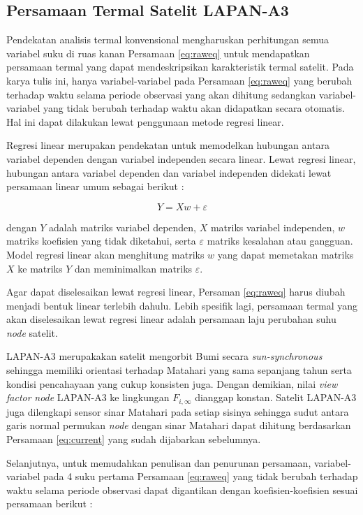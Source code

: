 \subsection{Persamaan Termal Satelit LAPAN-A3}

Pendekatan analisis termal konvensional mengharuskan perhitungan semua variabel
suku di ruas kanan Persamaan \ref{eq:raweq} untuk mendapatkan persamaan termal
yang dapat mendeskripsikan karakteristik termal satelit. Pada karya tulis ini,
hanya variabel-variabel pada Persamaan \ref{eq:raweq} yang berubah terhadap
waktu selama periode observasi yang akan dihitung sedangkan variabel-variabel
yang tidak berubah terhadap waktu akan didapatkan secara otomatis. Hal ini
dapat dilakukan lewat penggunaan metode regresi linear.

Regresi linear merupakan pendekatan untuk memodelkan hubungan antara variabel
dependen dengan variabel independen secara linear. Lewat regresi linear,
hubungan antara variabel dependen dan variabel independen didekati lewat
persamaan linear umum sebagai berikut \cite{freedman2009}:

\begin{equation}
\label{eq:reglinear}
Y = Xw + \varepsilon
\end{equation}

dengan $Y$ adalah matriks variabel dependen, $X$ matriks variabel independen,
$w$ matriks koefisien yang tidak diketahui, serta $\varepsilon$ matriks
kesalahan atau gangguan. Model regresi linear akan menghitung matriks $w$ yang dapat memetakan matriks $X$ ke matriks $Y$ dan meminimalkan matriks $\varepsilon$.

Agar dapat diselesaikan lewat regresi linear, Persaman \ref{eq:raweq} harus
diubah menjadi bentuk linear terlebih dahulu. Lebih spesifik lagi, persamaan
termal yang akan diselesaikan lewat regresi linear adalah persamaan laju
perubahan suhu \textit{node} satelit.

LAPAN-A3 merupakakan satelit mengorbit Bumi secara \textit{sun-synchronous}
sehingga memiliki orientasi terhadap Matahari yang sama sepanjang tahun serta
kondisi pencahayaan yang cukup konsisten juga. Dengan demikian, nilai
\textit{view factor} \textit{node} LAPAN-A3 ke lingkungan $F_{i,\infty}$
dianggap konstan. Satelit LAPAN-A3 juga dilengkapi sensor sinar Matahari pada
setiap sisinya sehingga sudut antara garis normal permukan \textit{node} dengan
sinar Matahari dapat dihitung berdasarkan Persamaan \ref{eq:current} yang sudah
dijabarkan sebelumnya.

Selanjutnya, untuk memudahkan penulisan dan penurunan persamaan,
variabel-variabel pada 4 suku pertama Persamaan \ref{eq:raweq} yang tidak
berubah terhadap waktu selama periode observasi dapat digantikan dengan
koefisien-koefisien sesuai persamaan berikut :

